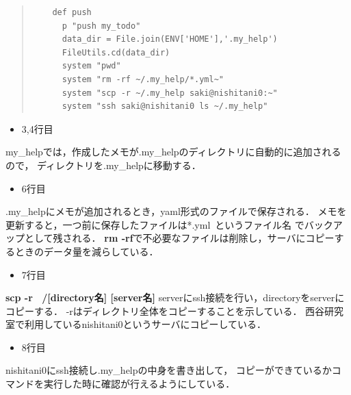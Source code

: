 \begin{quote}\begin{verbatim}
    def push
      p "push my_todo"
      data_dir = File.join(ENV['HOME'],'.my_help')
      FileUtils.cd(data_dir)
      system "pwd"
      system "rm -rf ~/.my_help/*.yml~"
      system "scp -r ~/.my_help saki@nishitani0:~"
      system "ssh saki@nishitani0 ls ~/.my_help" 
\end{verbatim}\end{quote}

\begin{itemize}
\item 3,4行目
\end{itemize}
\begin{description}
\item my\_helpでは，作成したメモが.my\_helpのディレクトリに自動的に追加されるので，
ディレクトリを.my\_helpに移動する．
\end{description}
\begin{itemize}
\item 6行目
\end{itemize}
\begin{description}
\item .my\_helpにメモが追加されるとき，yaml形式のファイルで保存される．
メモを更新すると，一つ前に保存したファイルは*.yml~というファイル名
でバックアップとして残される．
\textbf{rm -rf}で不必要なファイルは削除し，サーバにコピーするときのデータ量を減らしている．
\end{description}

\begin{itemize}
\item 7行目
\end{itemize}
\begin{description}
\item
\textbf{scp -r ~/[directory名] [server名]}
serverにssh接続を行い，directoryをserverにコピーする．
-rはディレクトリ全体をコピーすることを示している．
西谷研究室で利用しているnishitani0というサーバにコピーしている．
\end{description}

\begin{itemize}
\item 8行目
\end{itemize}
\begin{description}
\item nishitani0にssh接続し.my\_helpの中身を書き出して，
コピーができているかコマンドを実行した時に確認が行えるようにしている．
\end{description}

